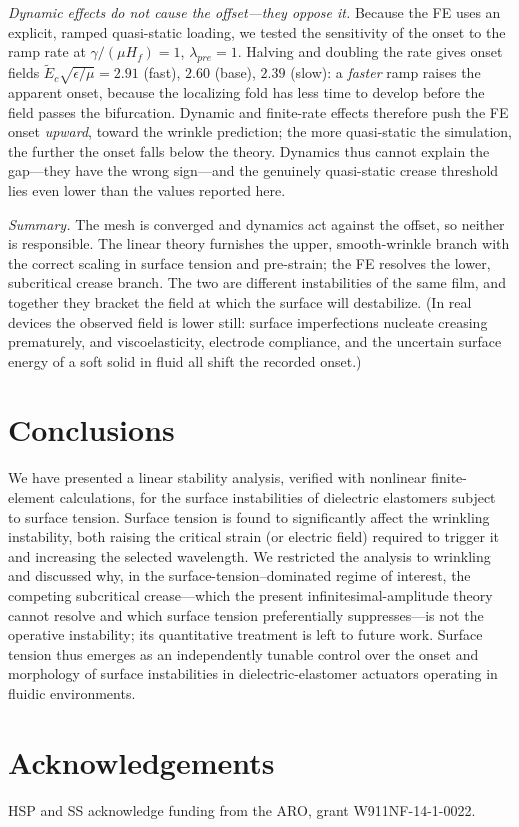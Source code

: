 \documentclass[final,3p,times]{elsarticle}
\begin{document}
\emph{Dynamic effects do not cause the offset---they oppose it.} Because the FE uses an explicit, ramped quasi-static loading, we tested the sensitivity of the onset to the ramp rate at $\gamma/(\mu H_f)=1$, $\lambda_{pre}=1$. Halving and doubling the rate gives onset fields $\tilde E_c\sqrt{\epsilon/\mu}=2.91$ (fast), $2.60$ (base), $2.39$ (slow): a \emph{faster} ramp raises the apparent onset, because the localizing fold has less time to develop before the field passes the bifurcation. Dynamic and finite-rate effects therefore push the FE onset \emph{upward}, toward the wrinkle prediction; the more quasi-static the simulation, the further the onset falls below the theory. Dynamics thus cannot explain the gap---they have the wrong sign---and the genuinely quasi-static crease threshold lies even lower than the values reported here.

\emph{Summary.} The mesh is converged and dynamics act against the offset, so neither is responsible. The linear theory furnishes the upper, smooth-wrinkle branch with the correct scaling in surface tension and pre-strain; the FE resolves the lower, subcritical crease branch. The two are different instabilities of the same film, and together they bracket the field at which the surface will destabilize. (In real devices the observed field is lower still: surface imperfections nucleate creasing prematurely, and viscoelasticity, electrode compliance, and the uncertain surface energy of a soft solid in fluid all shift the recorded onset.)

\section{Conclusions}

We have presented a linear stability analysis, verified with nonlinear finite-element calculations, for the surface instabilities of dielectric elastomers subject to surface tension. Surface tension is found to significantly affect the wrinkling instability, both raising the critical strain (or electric field) required to trigger it and increasing the selected wavelength. We restricted the analysis to wrinkling and discussed why, in the surface-tension--dominated regime of interest, the competing subcritical crease---which the present infinitesimal-amplitude theory cannot resolve and which surface tension preferentially suppresses---is not the operative instability; its quantitative treatment is left to future work. Surface tension thus emerges as an independently tunable control over the onset and morphology of surface instabilities in dielectric-elastomer actuators operating in fluidic environments.

\section{Acknowledgements}

HSP and SS acknowledge funding from the ARO, grant W911NF-14-1-0022.


\end{document}
